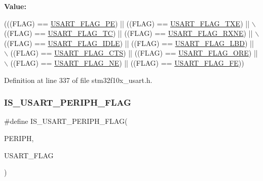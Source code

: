 {\bfseries Value\+:}
\begin{DoxyCode}
(((FLAG) == \hyperlink{group___u_s_a_r_t___flags_ga5e87fde5704f27c75df25395e23404ad}{USART\_FLAG\_PE}) || ((FLAG) == \hyperlink{group___u_s_a_r_t___flags_ga7129f13333f2a7218838cc32fe507bfa}{USART\_FLAG\_TXE}) || \(\backslash\)
                             ((FLAG) == \hyperlink{group___u_s_a_r_t___flags_gae7b85c9e2cc86af5bbc8b8d8b854410f}{USART\_FLAG\_TC}) || ((FLAG) == 
      \hyperlink{group___u_s_a_r_t___flags_ga11d6b70c8f00216b6d8a43790dfdcf2f}{USART\_FLAG\_RXNE}) || \(\backslash\)
                             ((FLAG) == \hyperlink{group___u_s_a_r_t___flags_gac2f1ccc91a834f9cbec3f058872b972a}{USART\_FLAG\_IDLE}) || ((FLAG) == 
      \hyperlink{group___u_s_a_r_t___flags_ga27be6517de20ce14711f71dcd5a7b91f}{USART\_FLAG\_LBD}) || \(\backslash\)
                             ((FLAG) == \hyperlink{group___u_s_a_r_t___flags_ga94b7272319cca88a65075d5cb6048441}{USART\_FLAG\_CTS}) || ((FLAG) == 
      \hyperlink{group___u_s_a_r_t___flags_gabdb285b5c1876d93f9c802f9304538d5}{USART\_FLAG\_ORE}) || \(\backslash\)
                             ((FLAG) == \hyperlink{group___u_s_a_r_t___flags_ga81781d27ffc8b85dfaf7b7b791229547}{USART\_FLAG\_NE}) || ((FLAG) == 
      \hyperlink{group___u_s_a_r_t___flags_ga3551a32bac49a2ec040e5fdafcc9c4bd}{USART\_FLAG\_FE}))
\end{DoxyCode}


Definition at line 337 of file stm32f10x\+\_\+usart.\+h.

\mbox{\label{group___u_s_a_r_t___flags_gad8395894e77b07a0713756b355aa22e5}} 
\subsubsection{\texorpdfstring{I\+S\+\_\+\+U\+S\+A\+R\+T\+\_\+\+P\+E\+R\+I\+P\+H\+\_\+\+F\+L\+AG}{IS\_USART\_PERIPH\_FLAG}}
{\footnotesize\ttfamily \#define I\+S\+\_\+\+U\+S\+A\+R\+T\+\_\+\+P\+E\+R\+I\+P\+H\+\_\+\+F\+L\+AG(\begin{DoxyParamCaption}\item[{}]{P\+E\+R\+I\+PH,  }\item[{}]{U\+S\+A\+R\+T\+\_\+\+F\+L\+AG }\end{DoxyParamCaption})}

